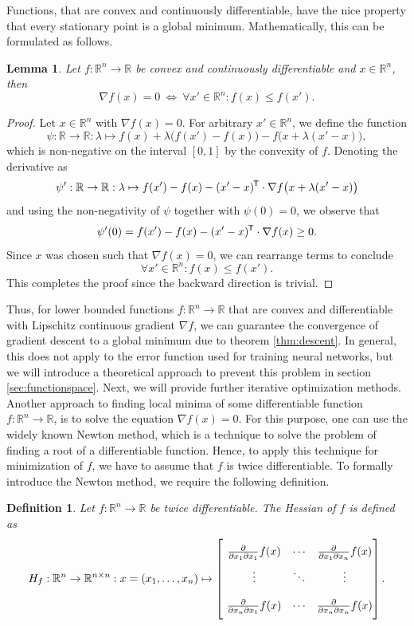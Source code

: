 \documentclass[11pt, a4paper]{article}
\newtheorem{lemma}[theorem]{Lemma}
\newtheorem{definition}[theorem]{Definition}
\newcommand{\R}{\mathbb{R}}
\newcommand*{\tr}{^{\mkern-1.5mu\mathsf{T}}}
\begin{document}
Functions, that are convex and continuously differentiable, have the nice property that every stationary point is a global minimum. Mathematically, this can be formulated as follows.

\begin{lemma}
Let $f: \R^n \to \R$ be convex and continuously differentiable and $x \in \R^n$, then
\[ \nabla f(x) = 0 \ \Leftrightarrow \ \forall x' \in \R^n : f(x) \leq f(x').  \]
\end{lemma}

\begin{proof}
Let $x \in \R^n$ with $\nabla f(x) = 0$. For arbitrary $x' \in \R^n$, we define the function
\[ \psi : \R \to \R : \lambda \mapsto f(x) + \lambda \big ( f(x') - f(x) \big ) - f \big ( x + \lambda (x'-x) \big ), \]
which is non-negative on the interval $[0,1]$ by the convexity of $f$. Denoting the derivative as
\[ \psi' : \R \to \R : \lambda \mapsto f(x') - f(x) - (x'-x) \tr \cdot \nabla f \big (x + \lambda(x'-x)\big ) \]
and using the non-negativity of $\psi$ together with $\psi(0) = 0$, we observe that
\[ \psi'(0) = f(x') - f(x) - (x'-x) \tr \cdot \nabla f(x) \geq 0. \]
Since $x$ was chosen such that $\nabla f(x) = 0$, we can rearrange terms to conclude
\[ \forall x' \in \R^n : f(x) \leq f(x'). \]
This completes the proof since the backward direction is trivial.
\end{proof}

Thus, for lower bounded functions $f: \R^n \to \R$ that are convex and differentiable with Lipschitz continuous gradient $\nabla f$, we can guarantee the convergence of gradient descent to a global minimum due to theorem \ref{thm:descent}. In general, this does not apply to the error function used for training neural networks, but we will introduce a theoretical approach to prevent this problem in section \ref{sec:functionspace}. Next, we will provide further iterative optimization methods. \\

Another approach to finding local minima of some differentiable function $f: \R^n \to \R$, is to solve the equation $\nabla f(x) = 0$. For this purpose, one can use the widely known Newton method, which is a technique to solve the problem of finding a root of a differentiable function. Hence, to apply this technique for minimization of $f$, we have to assume that $f$ is twice differentiable. To formally introduce the Newton method, we require the following definition.

\begin{definition}
Let $f: \R^n \to \R$ be twice differentiable. The Hessian of $f$ is defined as
\[ H_f : \R^n \to \R^{n \times n} : x = (x_1, \dots, x_n) \mapsto \begin{bmatrix} \textcolor{white}{\bigg |} \frac{\partial}{\partial x_1 \partial x_1} f(x) & \cdots & \frac{\partial}{\partial x_1 \partial x_n} f(x) \\ \textcolor{white}{\bigg |} \vdots & \ddots & \vdots \\ \textcolor{white}{\bigg |} \frac{\partial}{\partial x_n \partial x_1} f(x) & \cdots & \frac{\partial}{\partial x_n \partial x_n} f(x) \end{bmatrix}. \]
\end{definition}
\end{document}
